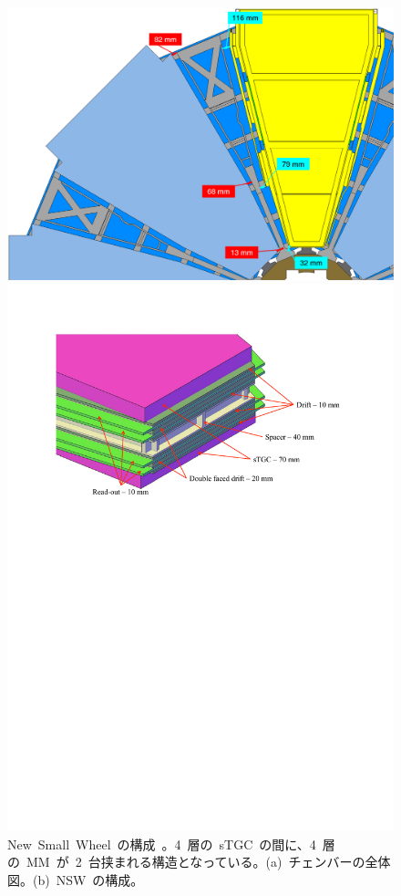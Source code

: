 \begin{figure}[H]
    \begin{minipage}{0.49\hsize}
	\centering			
	\includegraphics[width=\textwidth,page=1]{img/pdf/fig_026c.png}
	\subcaption{}
	\end{minipage}
	\begin{minipage}{0.49\hsize}
	\centering
	\includegraphics[width=\textwidth,page=1]{img/pdf/fig_042a.pdf}
	\subcaption{}
	\end{minipage}
    \caption[New~Small~Wheel~の構成]{New~Small~Wheel~の構成~\cite{AR:14}。4~層の~sTGC~の間に、4~層の~MM~が~2~台挟まれる構造となっている。(a)~チェンバーの全体図。(b)~NSW~の構成。}
    \label{fig:nsw}
\end{figure}

